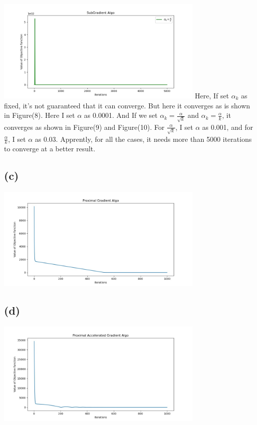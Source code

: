 \documentclass[12pt, a4 paper]{article}
\begin{document}
\begin{framed}
        {\centering
        \includegraphics[width=10cm, height=5cm]{Q10_2_2.jpg}
        }
        Here, If set $\alpha_{k}$ as fixed, it's not guaranteed that it can 
        converge. But here it converges as is shown in Figure(8). Here
        I set $\alpha$ as 0.0001. And If we set $\alpha_{k}=\frac{\alpha}{\sqrt{k}}$ and $\alpha_{k}
        =\frac{\alpha}{k}$, it converges as shown in Figure(9) and Figure(10).
        For $\frac{\alpha}{\sqrt{k}}$, I set $\alpha$ as 0.001, and for 
        $\frac{\alpha}{k}$, I set $\alpha$ as 0.03. Apprently, for 
        all the cases, it needs more than 5000 iterations to
        converge at a better result. 

        \subsection{(c)}
        {\centering
        \includegraphics[width=10cm, height=5cm]{Q10_3.jpg}
        }

        \subsection{(d)}
        {\centering
        \includegraphics[width=10cm, height=5cm]{Q10_4.jpg}
        }
    \end{framed}
\end{document}
